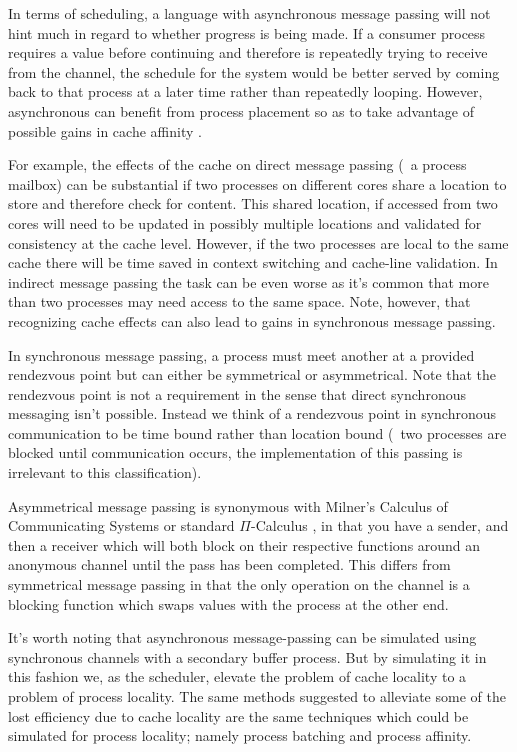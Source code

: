 In terms of scheduling, a language with asynchronous message passing will not 
hint much in regard to whether progress is being made. If a consumer process
requires a value before continuing and therefore is repeatedly trying to receive 
from the channel, the schedule for the system would be better served by coming 
back to that process at a later time rather than repeatedly looping. However,
asynchronous can benefit from process placement so as to take advantage of 
possible gains in cache affinity \cite{debattista2002cache}. 

For example, the 
effects of the cache on direct message passing (\eg~a process mailbox) can be 
substantial if two processes on different cores share a location to store and
therefore check for content. This shared location, if accessed from two cores
will need to be updated in possibly multiple locations and validated for
consistency at the cache level. However, if the two processes are local to the 
same cache there will be time saved in context switching and cache-line validation. 
In indirect message passing the task can be even worse as it's common that more
than two processes may need access to the same space. Note, however, that recognizing
cache effects can also lead to gains in synchronous message passing.

In synchronous message passing, a process must meet another at a provided 
rendezvous point but can either be symmetrical or asymmetrical. Note that the 
rendezvous point is not a requirement in the sense that direct synchronous 
messaging isn't possible. Instead we think of a rendezvous point in synchronous 
communication to be time bound rather than location bound (\ie~two processes are 
blocked until communication occurs, the implementation of this passing is 
irrelevant to this classification).

Asymmetrical message passing is synonymous with Milner's Calculus of 
Communicating Systems \cite{milner1982calculus} or standard $\Pi$-Calculus 
\cite{palamidessi1997comparing}, in that you have a sender, and then a receiver 
which will both block on their respective functions around an anonymous channel 
until the pass has been completed. This differs from symmetrical message 
passing in that the only operation on the channel is a blocking function which 
swaps values with the process at the other end.

It's worth noting that asynchronous message-passing can be simulated using 
synchronous channels with a secondary buffer process. But by simulating it in 
this fashion we, as the scheduler, elevate the problem of cache locality to a
problem of process locality. The same methods suggested to alleviate some of the 
lost efficiency due to cache locality \cite{markatos1991load,markatos1991memory}
are the same techniques which could be simulated for process locality; namely
process batching and process affinity.

